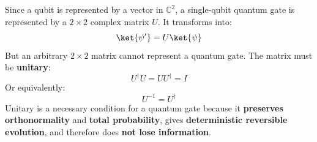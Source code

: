 {}
\highspace
{} Since a qubit is represented by a vector in $\mathbb{C}^{2}$, a single-qubit quantum gate is represented by a $2\times 2$ complex matrix $U$. It transforms \ket{\psi} into:
\begin{equation*}
    \ket{\psi'} = U\ket{\psi}
\end{equation*}
But an arbitrary $2\times 2$ matrix cannot represent a quantum gate. The matrix must be \textbf{unitary}:
\begin{equation*}
    U^{\dagger}U = UU^{\dagger} = I
\end{equation*}
Or equivalently:
\begin{equation*}
    U^{-1} = U^{\dagger}
\end{equation*}
Unitary is a necessary condition for a quantum gate because it \textbf{preserves orthonormality} and \textbf{total probability}, gives \textbf{deterministic reversible evolution}, and therefore does \textbf{not lose information}.

